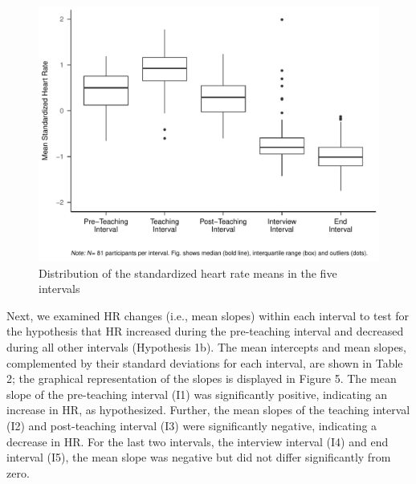 \documentclass[preprint, 3p,
authoryear]{elsarticle} %
\begin{document}
\begin{figure}[H]
  \centering
  \includegraphics[width=1\textwidth]{plots_publication/box_plot.pdf}
  \caption{Distribution of the standardized heart rate means in the five intervals}
  \label{Distribution of the standardized heart rate means in the five intervals}
\end{figure}

Next, we examined HR changes (i.e., mean slopes) within each interval to
test for the hypothesis that HR increased during the pre-teaching
interval and decreased during all other intervals (Hypothesis 1b). The
mean intercepts and mean slopes, complemented by their standard
deviations for each interval, are shown in Table 2; the graphical
representation of the slopes is displayed in Figure 5. The mean slope of
the pre-teaching interval (I1) was significantly positive, indicating an
increase in HR, as hypothesized. Further, the mean slopes of the
teaching interval (I2) and post-teaching interval (I3) were
significantly negative, indicating a decrease in HR. For the last two
intervals, the interview interval (I4) and end interval (I5), the mean
slope was negative but did not differ significantly from zero.

\renewcommand{\arraystretch}{1.5}
\end{document}
